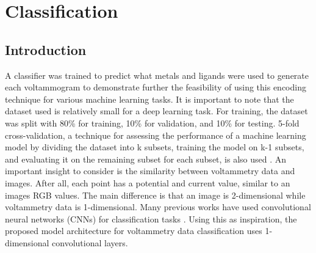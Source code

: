 \chapter{Classification} \label{chap:chap-3}




\section{Introduction}
A classifier was trained to predict what metals and ligands were used to generate each voltammogram to demonstrate further the feasibility of using this encoding technique for various machine learning tasks. It is important to note that the dataset used is relatively small for a deep learning task. For training, the dataset was split with 80\% for training, 10\% for validation, and 10\% for testing. 5-fold cross-validation, a technique for assessing the performance of a machine learning model by dividing the dataset into k subsets, training the model on k-1 subsets, and evaluating it on the remaining subset for each subset, is also used \cite{hastie_09_elements-of.statistical-learning}. An important insight to consider is the similarity between voltammetry data and images. After all, each point has a potential and current value, similar to an image\textquotesingle s RGB values. The main difference is that an image is 2-dimensional while voltammetry data is 1-dimensional. Many previous works have used convolutional neural networks (CNNs) for classification tasks \cite{SHARMA2018377}. Using this as inspiration, the proposed model architecture for voltammetry data classification uses 1-dimensional convolutional layers. 
